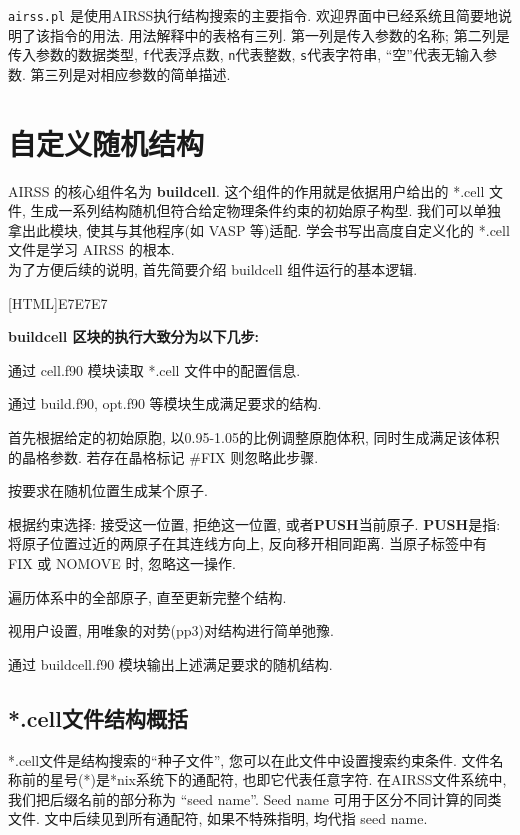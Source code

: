\documentclass[a4paper, 10pt]{article}
\begin{document}
 \verb|airss.pl| 是使用AIRSS执行结构搜索的主要指令. 欢迎界面中已经系统且简要地说明了该指令的用法. 用法解释中的表格有三列. 第一列是传入参数的名称; 第二列是传入参数的数据类型, \verb|f|代表浮点数, \verb|n|代表整数, \verb|s|代表字符串, ``空''代表无输入参数. 第三列是对相应参数的简单描述.

\newpage
\section{自定义随机结构}
AIRSS 的核心组件名为 \textbf{buildcell}. 这个组件的作用就是依据用户给出的 *.cell 文件, 生成一系列结构随机但符合给定物理条件约束的初始原子构型. 我们可以单独拿出此模块, 使其与其他程序(如 VASP 等)适配. 学会书写出高度自定义化的 *.cell 文件是学习 AIRSS 的根本.\\

为了方便后续的说明, 首先简要介绍 buildcell 组件运行的基本逻辑. 

\noindent{}[HTML]{E7E7E7}{\parbox{\textwidth}{%
\noindent \textbf{buildcell 区块的执行大致分为以下几步:}
\begin{maineu}
\item 通过 cell.f90 模块读取 *.cell 文件中的配置信息.
\item 通过 build.f90, opt.f90 等模块生成满足要求的结构. 
  \begin{subeu}
    \item 首先根据给定的初始原胞, 以0.95-1.05的比例调整原胞体积, 同时生成满足该体积的晶格参数. 若存在晶格标记 \#FIX 则忽略此步骤.
    \item 按要求在随机位置生成某个原子.
    \item 根据约束选择: 接受这一位置, 拒绝这一位置, 或者\textbf{PUSH}当前原子. \textbf{PUSH}是指: 将原子位置过近的两原子在其连线方向上, 反向移开相同距离. 当原子标签中有 FIX 或 NOMOVE 时, 忽略这一操作.
    \item 遍历体系中的全部原子, 直至更新完整个结构.
    \item 视用户设置, 用唯象的对势(pp3)对结构进行简单弛豫.
  \end{subeu}
\item 通过 buildcell.f90 模块输出上述满足要求的随机结构.
\end{maineu}}}

\subsection{*.cell文件结构概括}
*.cell文件是结构搜索的``种子文件'', 您可以在此文件中设置搜索约束条件. 文件名称前的星号(*)是*nix系统下的通配符, 也即它代表任意字符. 在AIRSS文件系统中, 我们把后缀名前的部分称为 ``seed name''. Seed name 可用于区分不同计算的同类文件. 文中后续见到所有通配符, 如果不特殊指明, 均代指 seed name.
\end{document}
